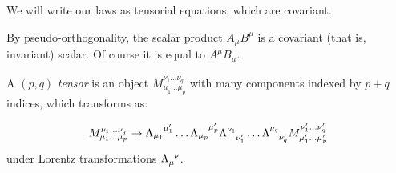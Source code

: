 \documentclass[main.tex]{subfiles}
\begin{document}
We will write our laws as tensorial equations, which are covariant.

By pseudo-orthogonality, the scalar product \(A_\mu B^\mu\) is a covariant (that is, invariant) scalar. Of course it is equal to \(A^\mu B_\mu\).

\begin{definition}[Tensor]
    A \((p, q)\) \emph{tensor} is an object \(M_{\mu_1 \dots \mu_p}^{\nu_1 \dots \nu_q}\) with many components indexed by \(p+q\) indices, which transforms as:

    \begin{equation}
        M_{\mu_1 \dots \mu_p}^{\nu_1 \dots \nu_q}
        \rightarrow
        \tensor{\Lambda}{_{\mu_1}^{\mu'_1}}\dots
        \tensor{\Lambda}{_{\mu_p}^{\mu'_p}}
        \tensor{\Lambda}{^{\nu_1}_{\nu'_1}}\dots
        \tensor{\Lambda}{^{\nu_q}_{\nu'_q}}
        M_{\mu_1' \dots \mu_p'}^{\nu_1' \dots \nu_q'}
    \end{equation}
    under Lorentz transformations \(\tensor{\Lambda}{_\mu^\nu}\).
\end{definition}
\end{document}
